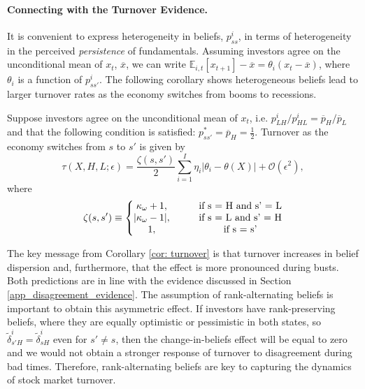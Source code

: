 \paragraph{Connecting with the Turnover Evidence.}
It is convenient to express heterogeneity in beliefs, $p_{ss}^i$, in terms of heterogeneity in the perceived \textit{persistence} of fundamentals. Assuming investors agree on the unconditional mean of $x_t$, $\overline{x}$, we can write $\mathbb{E}_{i,t}[x_{t+1}] - \overline{x} = \theta_i (x_t - \overline{x})$, where $\theta_i$ is a function of $p_{ss'}^i$.
The following corollary shows heterogeneous beliefs lead to larger turnover rates as the economy switches from booms to recessions.
\begin{corollary}\label{cor: turnover} Suppose investors agree on the unconditional mean of $x_t$, i.e. $p_{LH}^i / p_{HL}^i = \overline{p}_H / \overline{p}_L$ and that the following condition is satisfied: $p_{ss'}^* = \overline{p}_H = \frac{1}{2}$. Turnover as the economy switches from $s$ to $s'$ is given by
\begin{equation}
    \tau(X,H,L;\epsilon) = \frac{\zeta(s,s')}{2}\sum_{i=1}^I \eta_i |\theta_i - \theta(X)| + \mathcal{O}(\epsilon^2),
\end{equation}
where
\begin{equation*}
    \zeta(s,s') \equiv \left\{ 
    \begin{matrix}
    \kappa_\omega + 1, \qquad & \text{if } $s = H$ \text{ and } $s' = L$\\
    |\kappa_\omega - 1|, \qquad & \text{if } $s = L$ \text{ and } $s'  = H$\\
    1, \qquad & \text{if } $s = s'$
    \end{matrix}
    \right. 
\end{equation*}
\end{corollary}
 The key message from Corollary \ref{cor: turnover} is that turnover increases in belief dispersion and, furthermore, that the effect is more pronounced during busts. 
Both predictions are in line with the evidence discussed in Section \ref{app_disagreement_evidence}. The assumption of rank-alternating beliefs is important to obtain this asymmetric effect. 
If investors have rank-preserving beliefs, where they are equally optimistic or pessimistic in both states, so $\tilde{\delta}_{s'H}^i = \tilde{\delta}_{sH}^i $ even for $s'\neq s$, then the change-in-beliefs effect will be equal to zero and we would not obtain a stronger response of turnover to disagreement during bad times. Therefore, rank-alternating beliefs are key to capturing the dynamics of stock market turnover. 





